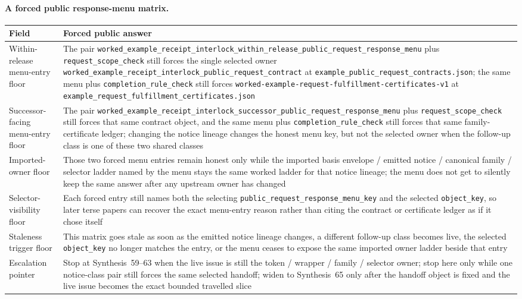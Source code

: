 \documentclass[11pt]{article}
\begin{document}
\paragraph{A forced public response-menu matrix.}
\begin{table}[t]
\centering
\small
\begin{tabularx}{\linewidth}{@{}lX@{}}
\toprule
Field & Forced public answer \\
\midrule
Within-release menu-entry floor & The pair \nolinkurl{worked_example_receipt_interlock_within_release_public_request_response_menu} plus \nolinkurl{request_scope_check} still forces the single selected owner \nolinkurl{worked_example_receipt_interlock_public_request_contract} at \nolinkurl{example_public_request_contracts.json}; the same menu plus \nolinkurl{completion_rule_check} still forces \nolinkurl{worked-example-request-fulfillment-certificates-v1} at \nolinkurl{example_request_fulfillment_certificates.json} \\
Successor-facing menu-entry floor & The pair \nolinkurl{worked_example_receipt_interlock_successor_public_request_response_menu} plus \nolinkurl{request_scope_check} still forces that same contract object, and the same menu plus \nolinkurl{completion_rule_check} still forces that same family-certificate ledger; changing the notice lineage changes the honest menu key, but not the selected owner when the follow-up class is one of these two shared classes \\
Imported-owner floor & Those two forced menu entries remain honest only while the imported basis envelope / emitted notice / canonical family / selector ladder named by the menu stays the same worked ladder for that notice lineage; the menu does not get to silently keep the same answer after any upstream owner has changed \\
Selector-visibility floor & Each forced entry still names both the selecting \nolinkurl{public_request_response_menu_key} and the selected \nolinkurl{object_key}, so later terse papers can recover the exact menu-entry reason rather than citing the contract or certificate ledger as if it chose itself \\
Staleness trigger floor & This matrix goes stale as soon as the emitted notice lineage changes, a different follow-up class becomes live, the selected \nolinkurl{object_key} no longer matches the entry, or the menu ceases to expose the same imported owner ladder beside that entry \\
Escalation pointer & Stop at Synthesis~59--63 when the live issue is still the token / wrapper / family / selector owner; stop here only while one notice-class pair still forces the same selected handoff; widen to Synthesis~65 only after the handoff object is fixed and the live issue becomes the exact bounded travelled slice \\

\end{tabularx}
\end{table}
\end{document}
